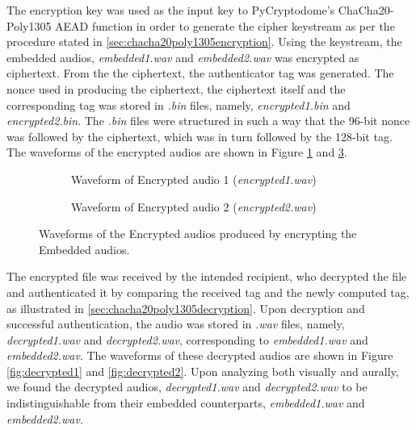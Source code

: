 \documentclass{article}
\begin{document}
The encryption key was used as the input key to PyCryptodome's ChaCha20-Poly1305 AEAD function in order to generate the cipher keystream as per the procedure stated in \ref{sec:chacha20poly1305encryption}. Using the keystream, the embedded audios, \textit{embedded1.wav} and \textit{embedded2.wav} was encrypted as ciphertext. From the the ciphertext, the authenticator tag was generated. The nonce used in producing the ciphertext, the ciphertext itself and the corresponding tag was stored in \textit{.bin} files, namely, \textit{encrypted1.bin} and \textit{encrypted2.bin}. The \textit{.bin} files were structured in such a way that the 96-bit nonce was followed by the ciphertext, which was in turn followed by the 128-bit tag. The waveforms of the encrypted audios are shown in Figure \ref{fig:encrypted1} and \ref{fig:encrypted2}.

\begin{figure}[!h]
    \begin{subfigure}[h]{0.45\textwidth}
        \begin{center}
            
            \caption{Waveform of Encrypted audio 1 (\textit{encrypted1.wav})}
            \label{fig:encrypted1}
        \end{center}
    \end{subfigure}
    \hfill
    \begin{subfigure}[h]{0.45\textwidth}
        \begin{center}
            
            \caption{Waveform of Encrypted audio 2 (\textit{encrypted2.wav})}
            \label{fig:encrypted2}
        \end{center}
    \end{subfigure}
    \caption{Waveforms of the Encrypted audios produced by encrypting the Embedded audios.}
\end{figure}

The encrypted file was received by the intended recipient, who decrypted the file and authenticated it by comparing the received tag and the newly computed tag, as illustrated in \ref{sec:chacha20poly1305decryption}. Upon decryption and successful authentication, the audio was stored in \textit{.wav} files, namely, \textit{decrypted1.wav} and \textit{decrypted2.wav}, corresponding to \textit{embedded1.wav} and \textit{embedded2.wav}. The waveforms of these decrypted audios are shown in Figure \ref{fig:decrypted1} and \ref{fig:decrypted2}. Upon analyzing both visually and aurally, we found the decrypted audios, \textit{decrypted1.wav} and \textit{decrypted2.wav} to be indistinguishable from their embedded counterparts, \textit{embedded1.wav} and \textit{embedded2.wav}.
\end{document}
